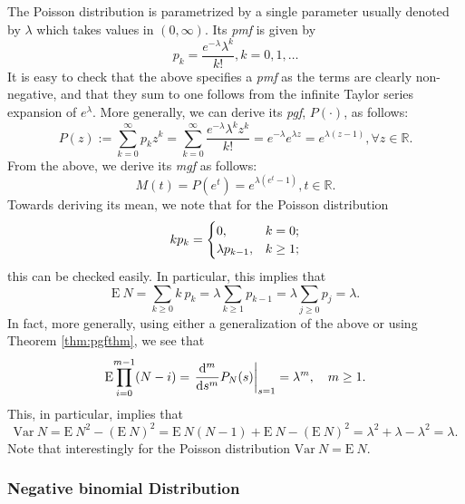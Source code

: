 \documentclass[]{book}
\theoremstyle{definition}
\theoremstyle{definition}
\theoremstyle{definition}
\theoremstyle{remark}
\begin{document}
The Poisson distribution is parametrized by a single parameter usually
denoted by \(\lambda\) which takes values in \((0,\infty)\). Its
\emph{pmf} is given by \[
p_k = \frac{e^{-\lambda}\lambda^k}{k!}, k=0,1,\ldots
\] It is easy to check that the above specifies a \emph{pmf} as the
terms are clearly non-negative, and that they sum to one follows from
the infinite Taylor series expansion of \(e^\lambda\). More generally,
we can derive its \emph{pgf}, \(P(\cdot)\), as follows: \[
P(z):= \sum_{k=0}^\infty p_k z^k = \sum_{k=0}^\infty  \frac{e^{-\lambda}\lambda^kz^k}{k!} = e^{-\lambda} e^{\lambda z}
= e^{\lambda(z-1)}, \forall z\in\mathbb{R}.
\] From the above, we derive its \emph{mgf} as follows: \[
M(t)=P(e^t)=e^{\lambda(e^t-1)}, t\in \mathbb{R}.
\] Towards deriving its mean, we note that for the Poisson distribution
\[
kp_k=\begin{cases}
0,  &k=0;\cr
\lambda p_{k-1}, &k\geq1;
\end{cases}
\] this can be checked easily. In particular, this implies that \[
\mathrm{E}~{N}=\sum_{k\geq 0} k~p_k =\lambda\sum_{k\geq 1} p_{k-1} = \lambda\sum_{j\geq 0} p_{j} =\lambda.
\] In fact, more generally, using either a generalization of the above
or using Theorem \ref{thm:pgfthm}, we see that \[
\mathrm{E}{\prod\limits_{i=0}^{m-1} (N-i)}=\left.\frac{{\rm d}^m}{{\rm d}s^m} P_N(s)\right\vert_{s=1}=\lambda^m, \quad m\geq 1.
\] This, in particular, implies that \[
\mathrm{Var}~{N}=\mathrm{E}~{N^2}-(\mathrm{E}~{N})^2 = \mathrm{E}~{N(N-1)}+\mathrm{E}~{N}-(\mathrm{E}~{N})^2=\lambda^2+\lambda-\lambda^2=\lambda.
\] Note that interestingly for the Poisson distribution
\(\mathrm{Var}~{N}=\mathrm{E}~{N}\).

\subsubsection{Negative binomial
Distribution}\label{S:negative-binomial-distribution}
\end{document}
